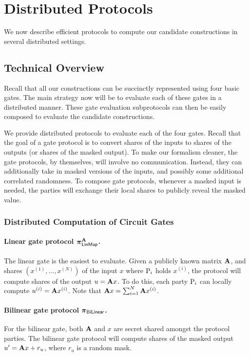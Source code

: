 \newpage
\section{Distributed Protocols}
\label{sec:distributed_protocols}
We now describe efficient protocols to compute our candidate constructions in several distributed settings.

\subsection{Technical Overview}
Recall that all our constructions can be succinctly represented using four basic gates. The main strategy now will be to evaluate each of these gates in a distributed manner. These gate evaluation subprotocols can then be easily composed to evaluate the  candidate constructions. 

We provide distributed protocols to evaluate each of the four gates. Recall that the goal of a gate protocol is to convert shares of the inputs to shares of the outputs (or shares of the masked output). To make our formalism cleaner, the gate protocols, by themselves, will involve no communication. Instead, they can additionally take in masked versions of the inputs, and possibly some additional correlated randomness. To compose gate protocols, whenever a masked input is needed, the parties will exchange their local shares to publicly reveal the masked value.

\subsubsection{Distributed Computation of Circuit Gates}

\paragraph{Linear gate protocol $\prot^\mat{A}_\LinMap$.}
The linear gate is the easiest to evaluate. Given a publicly known matrix $\mat{A}$, and shares $(x^{(1)}, \dots, x^{(N)})$ of the input $x$ where $\textnormal{P}_i$ holds $x^{(i)}$, the protocol will compute shares of the output $u = \mat{A}x$. To do this, each party $\textnormal{P}_i$ can locally compute $u^{(i)} = \mat{A}x^{(i)}$. Note that $\mat{A}x = \sum_{i=1}^N \mat{A}x^{(i)}$.

\paragraph{Bilinear gate protocol $\boldsymbol{\pi}_{\textsf{BiLinear}}$.}
For the bilinear gate, both $\mat{A}$ and $x$ are secret shared amongst the protocol parties. The bilinear gate protocol will compute shares of the masked output $u' = \mat{A}{x} + r_u$, where $r_u$ is a random mask. 

